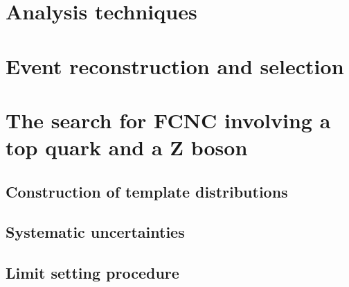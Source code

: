 \chapter[Tools for data exploration]{Analysis techniques}


%

\chapter[Putting the pieces together]{Event reconstruction and selection}


\chapter{The search for FCNC involving a top quark and a Z boson}
\section{Construction of template distributions}
\section{Systematic uncertainties}
\section{Limit setting procedure}
